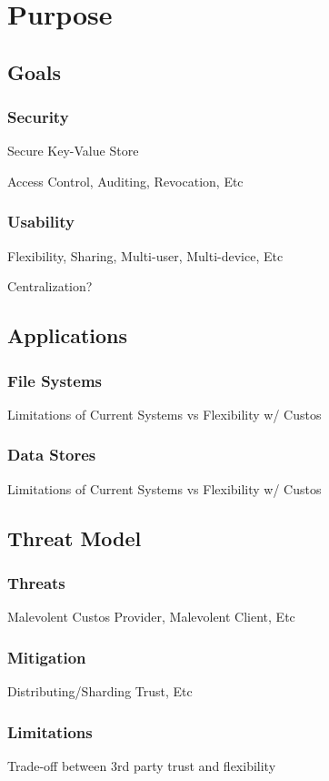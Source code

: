 \chapter{Purpose}
\label{chap:purpose}

\section{Goals}

\subsection{Security}

Secure Key-Value Store

Access Control, Auditing, Revocation, Etc

\subsection{Usability}

Flexibility, Sharing, Multi-user, Multi-device, Etc

Centralization?

\section{Applications}

\subsection{File Systems}

Limitations of Current Systems vs Flexibility w/ Custos

\subsection{Data Stores}

Limitations of Current Systems vs Flexibility w/ Custos

\section{Threat Model}

\subsection{Threats}

Malevolent Custos Provider, Malevolent Client, Etc

\subsection{Mitigation}

Distributing/Sharding Trust, Etc

\subsection{Limitations}

Trade-off between 3rd party trust and flexibility
